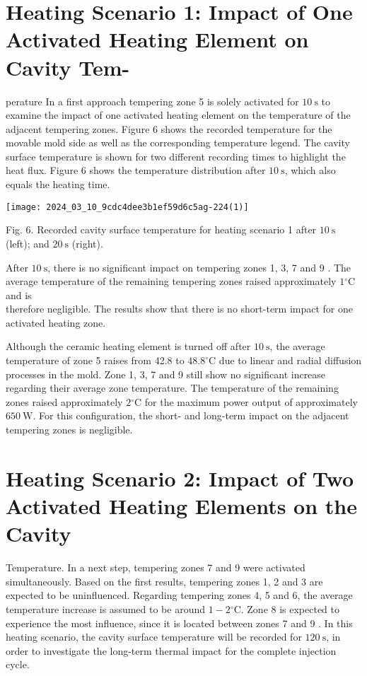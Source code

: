 \documentclass[10pt]{article}
\begin{document}
\section*{Heating Scenario 1: Impact of One Activated Heating Element on Cavity Tem-}
 perature In a first approach tempering zone 5 is solely activated for $10 \mathrm{~s}$ to examine the impact of one activated heating element on the temperature of the adjacent tempering zones. Figure 6 shows the recorded temperature for the movable mold side as well as the corresponding temperature legend. The cavity surface temperature is shown for two different recording times to highlight the heat flux. Figure 6 shows the temperature distribution after $10 \mathrm{~s}$, which also equals the heating time.\begin{center}
\texttt{[image: 2024\_03\_10\_9cdc4dee3b1ef59d6c5ag-224(1)]}
\end{center}

Fig. 6. Recorded cavity surface temperature for heating scenario 1 after $10 \mathrm{~s}$ (left); and $20 \mathrm{~s}$ (right).

After $10 \mathrm{~s}$, there is no significant impact on tempering zones 1, 3, 7 and 9 . The average temperature of the remaining tempering zones raised approximately $1{ }^{\circ} \mathrm{C}$ and is\\
therefore negligible. The results show that there is no short-term impact for one activated heating zone.

Although the ceramic heating element is turned off after $10 \mathrm{~s}$, the average temperature of zone 5 raises from 42.8 to $48.8^{\circ} \mathrm{C}$ due to linear and radial diffusion processes in the mold. Zone 1, 3, 7 and 9 still show no significant increase regarding their average zone temperature. The temperature of the remaining zones raised approximately $2{ }^{\circ} \mathrm{C}$ for the maximum power output of approximately $650 \mathrm{~W}$. For this configuration, the short- and long-term impact on the adjacent tempering zones is negligible.

\section*{Heating Scenario 2: Impact of Two Activated Heating Elements on the Cavity}
Temperature. In a next step, tempering zones 7 and 9 were activated simultaneously. Based on the first results, tempering zones 1, 2 and 3 are expected to be uninfluenced. Regarding tempering zones 4, 5 and 6, the average temperature increase is assumed to be around $1-2{ }^{\circ} \mathrm{C}$. Zone 8 is expected to experience the most influence, since it is located between zones 7 and 9 . In this heating scenario, the cavity surface temperature will be recorded for $120 \mathrm{~s}$, in order to investigate the long-term thermal impact for the complete injection cycle.
\end{document}
